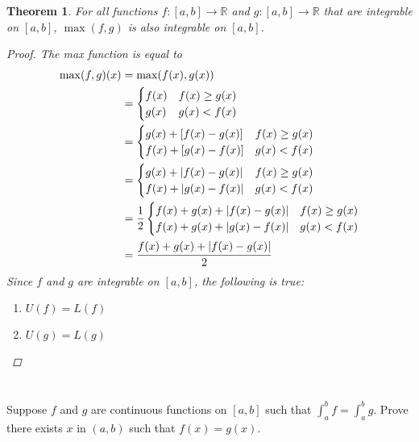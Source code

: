 \documentclass[]{article}
\newcommand{\R}{\mathbb{R}}
\newtheorem{theorem}{Theorem}
\begin{document}
\begin{theorem}
    For all functions $f: [a,b] \to \R$ and $g: [a,b] \to \R$ that are integrable on $[a,b]$,
    $\max(f,g)$ is also integrable on $[a,b]$.
    \begin{proof}
        The max function is equal to
        \begin{align*}
            \max(f,g)(x) 
                &= \max(f(x),g(x))\\
                &=\begin{cases}
                    f(x) &f(x) \geq g(x)\\
                    g(x) &g(x) < f(x)
                \end{cases}\\
                &= \begin{cases}
                    g(x) + [f(x) - g(x)] &f(x) \geq g(x)\\
                    f(x) + [g(x) - f(x)] &g(x) < f(x)
                \end{cases}\\
                &= \begin{cases}
                    g(x) + \abs{f(x) - g(x)} &f(x) \geq g(x)\\
                    f(x) + \abs{g(x) - f(x)} &g(x) < f(x)
                \end{cases}\\
                &= \frac{1}{2} \begin{cases}
                    f(x) + g(x) + \abs{f(x) - g(x)} &f(x) \geq g(x)\\
                    f(x) + g(x) + \abs{g(x) - f(x)} &g(x) < f(x)
                \end{cases}\\
                &= \cfrac{f(x) + g(x) + \abs{f(x) - g(x)}}{2}
        \end{align*}
        Since $f$ and $g$ are integrable on $[a,b]$, the following is true:
        \begin{enumerate}
            \item $U(f) = L(f)$
            \item $U(g) = L(g)$
        \end{enumerate}
        
    \end{proof}
\end{theorem}




\newpage
\section{}
Suppose $f$ and $g$ are continuous functions on $[a,b]$ such that $\int_{a}^{b} f = \int_{a}^{b} g$. 
Prove there exists $x$ in $(a,b)$ such that $f(x) = g(x)$.
\end{document}
